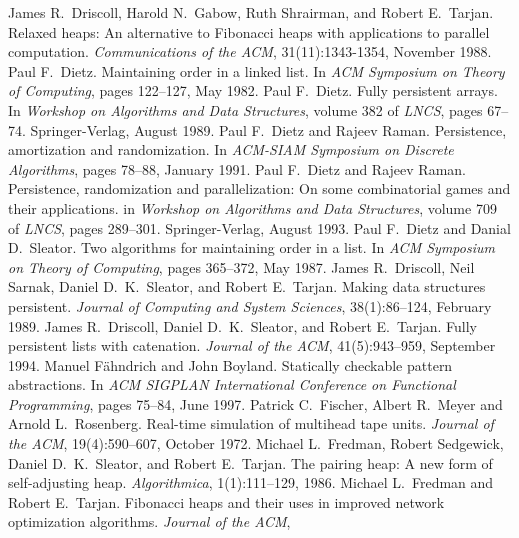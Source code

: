 \begin{thebibliography}{XXXXXXX}
 James R.~Driscoll, Harold
  N.~Gabow, Ruth Shrairman, and Robert E.~Tarjan. Relaxed heaps: An
  alternative to Fibonacci heaps with applications to parallel
  computation. \textit{Communications of the ACM}, 31(11):1343-1354,
  November 1988.
 Paul F.~Dietz. Maintaining order in a
  linked list. In \textit{ACM Symposium on Theory of Computing}, pages
  122--127, May 1982.
 Paul F.~Dietz. Fully persistent arrays. In
  \textit{Workshop on Algorithms and Data Structures}, volume 382 of
  \textit{LNCS}, pages 67--74. Springer-Verlag, August 1989.
 Paul F.~Dietz and Rajeev
  Raman. Persistence, amortization and randomization. In
  \textit{ACM-SIAM Symposium on Discrete Algorithms}, pages 78--88,
  January 1991.
 Paul F.~Dietz and Rajeev Raman.
  Persistence, randomization and parallelization: On some
  combinatorial games and their applications. in \textit{Workshop on
    Algorithms and Data Structures}, volume 709 of \textit{LNCS},
  pages 289--301. Springer-Verlag, August 1993.
 Paul F.~Dietz and Danial
  D.~Sleator. Two algorithms for maintaining order in a list. In
  \textit{ACM Symposium on Theory of Computing}, pages 365--372, May 1987.
 James R.~Driscoll, Neil Sarnak,
  Daniel D.~K.~Sleator, and Robert E.~Tarjan. Making data structures
  persistent. \textit{Journal of Computing and System Sciences},
  38(1):86--124, February 1989.
 James R.~Driscoll, Daniel
  D.~K.~Sleator, and Robert E.~Tarjan. Fully persistent lists with
  catenation. \textit{Journal of the ACM}, 41(5):943--959, September 1994.
 Manuel F\"ahndrich and John
  Boyland. Statically checkable pattern abstractions. In \textit{ACM
    SIGPLAN International Conference on Functional Programming}, pages
  75--84, June 1997.
 Patrick C.~Fischer, Albert
  R.~Meyer and Arnold L.~Rosenberg. Real-time simulation of multihead
  tape units. \textit{Journal of the ACM}, 19(4):590--607, October 1972.
 Michael L.~Fredman, Robert
  Sedgewick, Daniel D.~K.~Sleator, and Robert E.~Tarjan. The pairing
  heap: A new form of self-adjusting heap. \textit{Algorithmica},
  1(1):111--129, 1986.
 Michael L.~Fredman and Robert
  E.~Tarjan. Fibonacci heaps and their uses in improved network
  optimization algorithms. \textit{Journal of the ACM},

\end{thebibliography}
